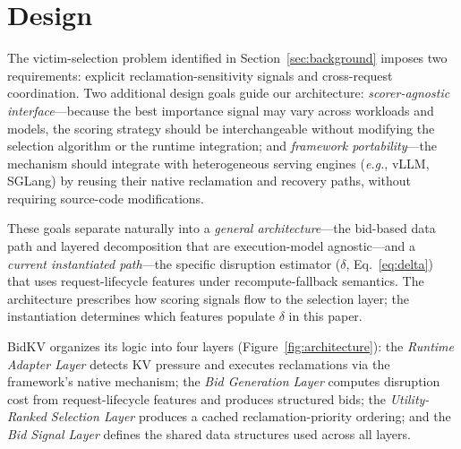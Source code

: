 \documentclass[sigconf,nonacm]{acmart}
\newcommand{\bidkv}{BidKV\xspace}
\newcommand{\qualdelta}{\ensuremath{\delta}}
\newcommand{\eg}{\emph{e.g.},\xspace}
\begin{document}
\section{Design}\label{sec:design}

The victim-selection problem identified in Section~\ref{sec:background}
imposes two requirements: explicit reclamation-sensitivity signals and
cross-request coordination.  Two additional design goals guide our architecture:
\emph{scorer-agnostic interface}---because the best importance signal may vary
across workloads and models, the scoring strategy should be interchangeable
without modifying the selection algorithm or the runtime integration; and
\emph{framework portability}---the mechanism should integrate with heterogeneous
serving engines (\eg vLLM, SGLang) by reusing their native reclamation and
recovery paths, without requiring source-code modifications.

These goals separate naturally into a \emph{general architecture}---the
bid-based data path and layered decomposition that are execution-model
agnostic---and a \emph{current instantiated path}---the specific disruption
estimator ($\qualdelta$, Eq.~\ref{eq:delta}) that uses request-lifecycle
features under recompute-fallback semantics.  The architecture prescribes how
scoring signals flow to the selection layer; the instantiation determines which features
populate $\qualdelta$ in this paper.

\bidkv organizes its logic into four layers (Figure~\ref{fig:architecture}): the
\emph{Runtime Adapter Layer} detects KV pressure and executes reclamations via
the framework's native mechanism; the \emph{Bid Generation Layer} computes
disruption cost from request-lifecycle features and produces structured bids;
the \emph{Utility-Ranked Selection Layer}
produces a cached reclamation-priority ordering; and the \emph{Bid Signal Layer}
defines the shared data structures used across all layers.




\end{document}
